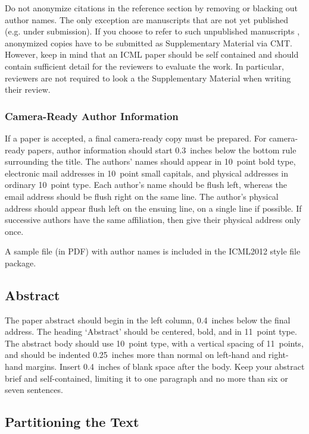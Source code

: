 \documentclass{article}
\begin{document}
Do not anonymize citations in the reference section by removing or
blacking out author names. The only exception are manuscripts that are
not yet published (e.g. under submission). If you choose to refer to
such unpublished manuscripts \cite{anonymous}, anonymized copies have to be submitted
as Supplementary Material via CMT. However, keep in mind that an ICML
paper should be self contained and should contain sufficient detail
for the reviewers to evaluate the work. In particular, reviewers are
not required to look a the Supplementary Material when writing their
review.

\subsubsection{Camera-Ready Author Information}
\label{final author}

If a paper is accepted, a final camera-ready copy must be prepared.
%
For camera-ready papers, author information should start 0.3~inches
below the bottom rule surrounding the title. The authors' names should
appear in 10~point bold type, electronic mail addresses in 10~point
small capitals, and physical addresses in ordinary 10~point type.
Each author's name should be flush left, whereas the email address
should be flush right on the same line. The author's physical address
should appear flush left on the ensuing line, on a single line if
possible. If successive authors have the same affiliation, then give
their physical address only once.

A sample file (in PDF) with author names is included in the ICML2012 style file package.

\subsection{Abstract}

The paper abstract should begin in the left column, 0.4~inches below
the final address. The heading `Abstract' should be centered, bold,
and in 11~point type. The abstract body should use 10~point type, with
a vertical spacing of 11~points, and should be indented 0.25~inches
more than normal on left-hand and right-hand margins. Insert
0.4~inches of blank space after the body. Keep your abstract brief and self-contained,
limiting it to one paragraph and no more than six or seven sentences.

\subsection{Partitioning the Text}
\end{document}
